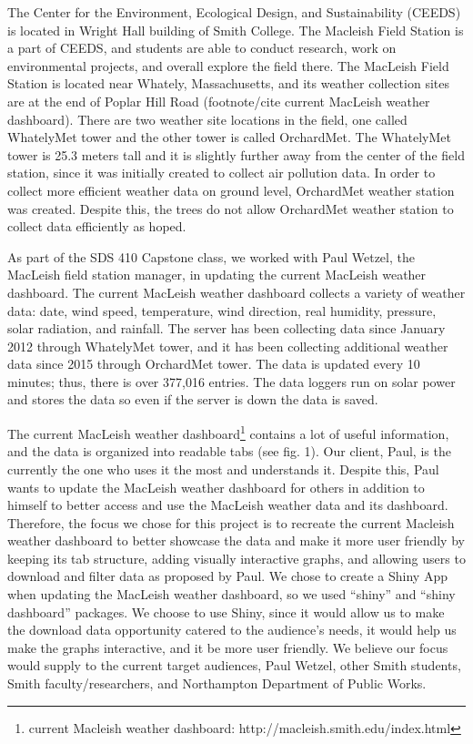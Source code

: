 \documentclass[10pt,letterpaper]{article}
\begin{document}
The Center for the Environment, Ecological Design, and Sustainability
(CEEDS) is located in Wright Hall building of Smith College. The
Macleish Field Station is a part of CEEDS, and students are able to
conduct research, work on environmental projects, and overall explore
the field there. The MacLeish Field Station is located near Whately,
Massachusetts, and its weather collection sites are at the end of Poplar
Hill Road (footnote/cite current MacLeish weather dashboard). There are
two weather site locations in the field, one called WhatelyMet tower and
the other tower is called OrchardMet. The WhatelyMet tower is 25.3
meters tall and it is slightly further away from the center of the field
station, since it was initially created to collect air pollution data.
In order to collect more efficient weather data on ground level,
OrchardMet weather station was created. Despite this, the trees do not
allow OrchardMet weather station to collect data efficiently as hoped.

As part of the SDS 410 Capstone class, we worked with Paul Wetzel, the
MacLeish field station manager, in updating the current MacLeish weather
dashboard. The current MacLeish weather dashboard collects a variety of
weather data: date, wind speed, temperature, wind direction, real
humidity, pressure, solar radiation, and rainfall. The server has been
collecting data since January 2012 through WhatelyMet tower, and it has
been collecting additional weather data since 2015 through OrchardMet
tower. The data is updated every 10 minutes; thus, there is over 377,016
entries. The data loggers run on solar power and stores the data so even
if the server is down the data is saved.

The current MacLeish weather dashboard\footnote{current Macleish weather
  dashboard: http://macleish.smith.edu/index.html} contains a lot of
useful information, and the data is organized into readable tabs (see
fig. 1). Our client, Paul, is the currently the one who uses it the most
and understands it. Despite this, Paul wants to update the MacLeish
weather dashboard for others in addition to himself to better access and
use the MacLeish weather data and its dashboard. Therefore, the focus we
chose for this project is to recreate the current Macleish weather
dashboard to better showcase the data and make it more user friendly by
keeping its tab structure, adding visually interactive graphs, and
allowing users to download and filter data as proposed by Paul. We chose
to create a Shiny App when updating the MacLeish weather dashboard, so
we used ``shiny'' and ``shiny dashboard'' packages. We choose to use
Shiny, since it would allow us to make the download data opportunity
catered to the audience's needs, it would help us make the graphs
interactive, and it be more user friendly. We believe our focus would
supply to the current target audiences, Paul Wetzel, other Smith
students, Smith faculty/researchers, and Northampton Department of
Public Works.
\end{document}
